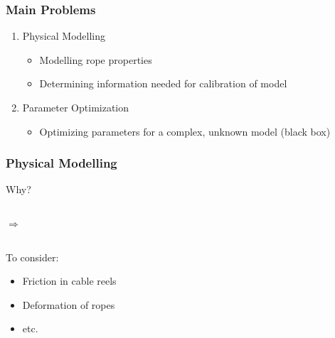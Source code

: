 \begin{frame}[c]
	\frametitle{Main Problems}
	\begin{enumerate}
		\item{Physical Modelling}
			\begin{itemize}
				\item{Modelling rope properties}
				\item{Determining information needed for calibration of model}
			\end{itemize}
		\vspace{0.5cm}
		\item{Parameter Optimization}
			\begin{itemize}
				\item{Optimizing parameters for a complex, unknown model (black box)}
			\end{itemize}
	\end{enumerate}
\end{frame}

\begin{frame}[c]
	\frametitle{Physical Modelling}
	Why?
	
	\vspace{0.5cm}
	
	\begin{columns}[t]
			\centering
			\centering
			$\Rightarrow$
			\centering
	\end{columns}
	
	\vspace{1cm}
	
	To consider:
	\begin{itemize}
		\item{Friction in cable reels}
		\item{Deformation of ropes}
		\item{etc.}
	\end{itemize}
\end{frame}

